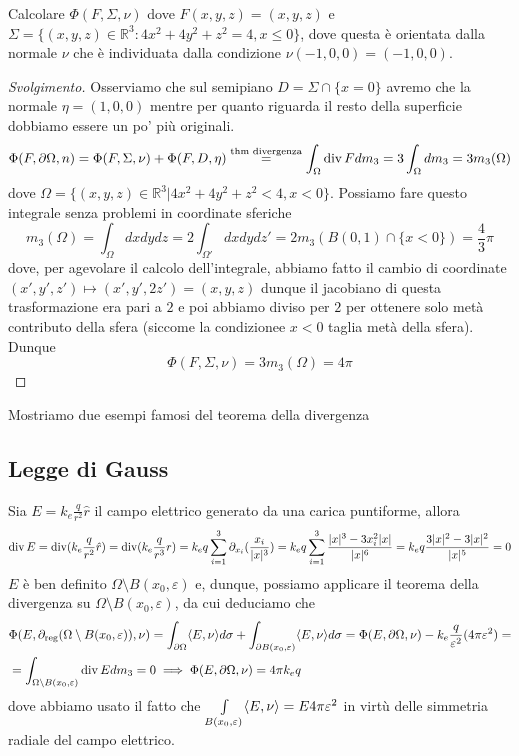 \begin{example}
	Calcolare $\Phi(F, \Sigma, \nu)$ dove $F(x, y, z)=(x, y, z)$ e $\Sigma=\{(x, y, z) \in \mathbb{R}^3 : 4x^2 + 4y^2 + z^2 = 4, x \leq 0 \}$, dove questa è orientata dalla normale $\nu$ che è individuata dalla condizione
	$\nu(-1, 0, 0) = (-1, 0, 0)$.
\end{example}
\begin{proof}[Svolgimento]
	Osserviamo che sul semipiano $D = \Sigma \cap \{x = 0\}$ avremo che la normale $\eta = (1, 0, 0)$ mentre per quanto riguarda il resto della superficie dobbiamo essere un po' più originali.
	$$
	\Phi(F, \partial \Omega, n) = \Phi(F, \Sigma, \nu) + \Phi(F, D, \eta) \stackrel{\text{thm divergenza}}{=} \int_\Omega \operatorname{div} F dm_3 = 3\int_\Omega dm_3 = 3m_3(\Omega) 
	$$
	dove $\Omega = \{(x, y, z) \in \mathbb{R}^3 | 4x^2 + 4y^2 + z^2 < 4, x < 0 \}$. Possiamo fare questo integrale senza problemi in coordinate sferiche
	$$
	m_3(\Omega) = \int_\Omega dxdydz = 2 \int_{\Omega'} dxdydz' = 2 m_3(B(0, 1) \cap \{ x < 0 \})= \frac{4}{3} \pi 
	$$
	dove, per agevolare il calcolo dell'integrale, abbiamo fatto il cambio di coordinate $(x', y', z') \mapsto (x', y', 2z') = (x, y, z)$ dunque il jacobiano di questa trasformazione era pari a $2$ e poi abbiamo diviso per $2$ per ottenere solo metà contributo della sfera (siccome la condizionee $x<0$ taglia metà della sfera).
	Dunque
	$$
	\Phi(F, \Sigma, \nu) = 3m_3(\Omega) = 4\pi
	$$
\end{proof}
Mostriamo due esempi famosi del teorema della divergenza
\subsection{Legge di Gauss}
Sia $E = k_e \frac{q}{r^2}\hat{r}$ il campo elettrico generato da una carica puntiforme, allora
$$
\operatorname{div} E = \operatorname{div}(k_e \frac{q}{r^2} \hat{r}) = \operatorname{div}(k_e \frac{q}{r^3}r) = k_e q \sum_{i=1}^3 \partial_{x_i} (\frac{x_i}{|x|^3}) = k_e q \sum_{i=1}^3 \frac{|x|^3 - 3 x_i^2 |x|}{|x|^6} = k_e q \frac{3|x|^2 - 3 |x|^2}{|x|^5} = 0
$$ 
$E$ è ben definito $\Omega \setminus B(x_0, \varepsilon)$ e, dunque, possiamo applicare il teorema della divergenza su $\Omega \setminus B(x_0, \varepsilon)$, da cui deduciamo che
\begin{align*}
&\Phi(E, \partial_{\text{reg}} (\Omega \setminus B(x_0, \varepsilon)), \nu) = \int_{\partial \Omega} \langle E, \nu \rangle d\sigma + \int_{\partial B(x_0, \varepsilon)} \langle E, \nu \rangle d\sigma = \Phi(E, \partial \Omega, \nu) - k_e \frac{q}{\varepsilon^2} (4 \pi \varepsilon^2) = \\
&=\int_{\Omega \setminus B(x_0, \varepsilon)} \operatorname{div} E dm_3 = 0 \implies \Phi(E, \partial \Omega, \nu) = 4 \pi k_e q
\end{align*}
dove abbiamo usato il fatto che $\int\limits_{B(x_0, \varepsilon)} \langle E, \nu \rangle = E 4 \pi \varepsilon^2$ in virtù delle simmetria radiale del campo elettrico.
